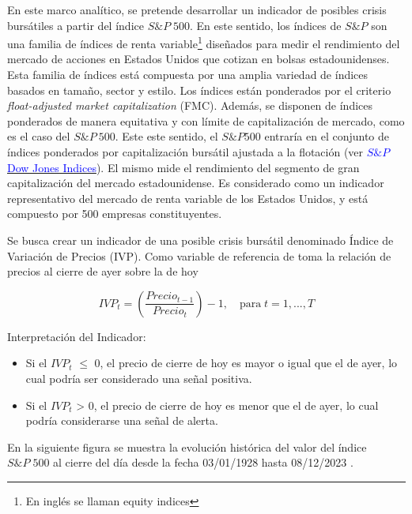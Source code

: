 \documentclass[
  12pt]{article}
\begin{document}
En este marco analítico, se pretende desarrollar un indicador de
posibles crisis bursátiles a partir del índice \(S\&P\;500\). En este
sentido, los índices de \(S\&P\) son una familia de índices de renta
variable\footnote{En inglés se llaman equity indices} diseñados para
medir el rendimiento del mercado de acciones en Estados Unidos que
cotizan en bolsas estadounidenses. Esta familia de índices está
compuesta por una amplia variedad de índices basados en tamaño, sector y
estilo. Los índices están ponderados por el criterio
\textit{float-adjusted market capitalization} (FMC). Además, se disponen
de índices ponderados de manera equitativa y con límite de
capitalización de mercado, como es el caso del \(S\&P\:500\). Este este
sentido, el \(S\&P 500\) entraría en el conjunto de índices ponderados
por capitalización bursátil ajustada a la flotación (ver
\href{https://www.spglobal.com/spdji/en/methodology/article/sp-us-indices-methodology/}{\textcolor{blue}{$S\&P$ Dow Jones Indices}}).
El mismo mide el rendimiento del segmento de gran capitalización del
mercado estadounidense. Es considerado como un indicador representativo
del mercado de renta variable de los Estados Unidos, y está compuesto
por 500 empresas constituyentes.

Se busca crear un indicador de una posible crisis bursátil denominado
Índice de Variación de Precios (IVP). Como variable de referencia de
toma la relación de precios al cierre de ayer sobre la de hoy

\begin{equation}
IVP_t=\left ( \frac{Precio_{t-1}}{Precio_t}\right ) -1,\quad\text{para}\; t=1,...,T 
\end{equation} \vspace{0.5cm}

Interpretación del Indicador:

\begin{itemize}
\item Si el $IVP_t$    $\leq$ 0, el precio de cierre de hoy es mayor o igual que el de ayer, lo cual podría ser considerado una señal positiva.
\item Si el $IVP_t$ > 0, el precio de cierre de hoy es menor que el de ayer, lo cual podría considerarse una señal de alerta.
\end{itemize}

En la siguiente figura se muestra la evolución histórica del valor del
índice \(S\&P\; 500\) al cierre del día desde la fecha 03/01/1928 hasta
08/12/2023 . \vspace{0.5cm}
\end{document}
